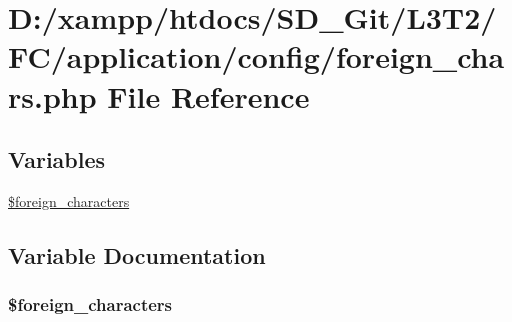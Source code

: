 \hypertarget{application_2config_2foreign__chars_8php}{}\section{D\+:/xampp/htdocs/\+S\+D\+\_\+\+Git/\+L3\+T2/\+F\+C/application/config/foreign\+\_\+chars.php File Reference}
\label{application_2config_2foreign__chars_8php}
\subsection*{Variables}
\begin{DoxyCompactItemize}
\item 
\hyperlink{application_2config_2foreign__chars_8php_a77bf091eac4b63b8efea27293e5ca79b}{\$foreign\+\_\+characters}
\end{DoxyCompactItemize}


\subsection{Variable Documentation}
\hypertarget{application_2config_2foreign__chars_8php_a77bf091eac4b63b8efea27293e5ca79b}{}
\subsubsection[{\$foreign\+\_\+characters}]{\setlength{\rightskip}{0pt plus 5cm}\$foreign\+\_\+characters}\label{application_2config_2foreign__chars_8php_a77bf091eac4b63b8efea27293e5ca79b}
